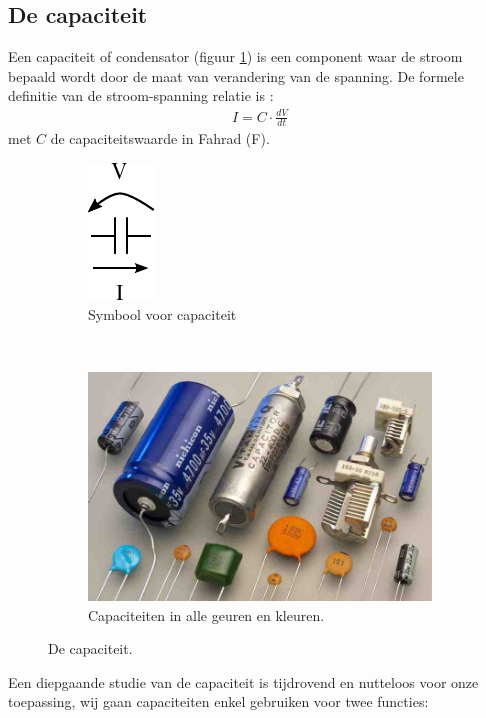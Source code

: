 \documentclass{article}
\begin{document}
		\subsection{De capaciteit}
		Een capaciteit of condensator (figuur \ref{fig:capaciteit}) is een component waar de stroom bepaald wordt door de maat van verandering van de spanning. De formele definitie van de stroom-spanning relatie is :
		\begin{align}
		    I = C \cdot \frac{dV}{dt}
		\end{align}
		met $C$ de capaciteitswaarde in Fahrad (F). 
		\begin{figure}[htbp!]
			\centering
			\begin{subfigure}[b]{0.45\linewidth}
				\centering
				\includegraphics{cap}
				\caption{Symbool voor capaciteit}
			\end{subfigure}
			~
			\begin{subfigure}[b]{0.45\linewidth}
				\centering
				\includegraphics[scale=0.6]{caps}
				\caption{Capaciteiten in alle geuren en kleuren.}
			\end{subfigure}
		\caption{De capaciteit.}
		\label{fig:capaciteit}
		\end{figure}
		Een diepgaande studie van de capaciteit is tijdrovend en nutteloos voor onze toepassing, wij gaan capaciteiten enkel  gebruiken voor twee functies:
\end{document}
